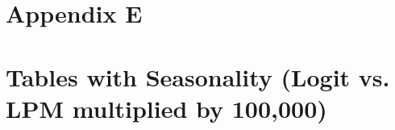 






\clearpage
\pagebreak

\section*{Appendix E}
\vspace{3.0in}

\section*{Tables with Seasonality (Logit vs. LPM multiplied by 100,000)}

\vfill
\eject







